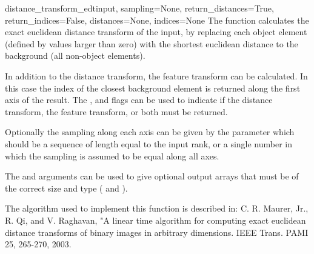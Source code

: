 \begin{funcdesc}{distance_transform_edt}{input, sampling=None,
  return_distances=True, return_indices=False, distances=None, 
  indices=None} The function  calculates 
  the exact euclidean distance transform of the input, by replacing each 
  object element (defined by values larger than zero) with the shortest 
  euclidean distance to the background (all non-object elements).
  
  In addition to the distance transform, the feature transform can be
  calculated. In this case the index of the closest background element is
  returned along the first axis of the result.  The , 
  and  flags can be used to indicate if the distance 
  transform, the feature transform, or both must be returned.
  
  Optionally the sampling along each axis can be given by the 
   parameter which should be a sequence of length equal to 
  the input rank, or a single number in which the sampling is assumed to be 
  equal along all axes.

  The  and  arguments can be used to give 
  optional output arrays that must be of the correct size and type 
  ( and ).
  
  The algorithm used to implement this function is described in: C. R. 
  Maurer, Jr., R. Qi, and V. Raghavan, "A linear time algorithm for 
  computing exact euclidean distance transforms of binary images in 
  arbitrary dimensions. IEEE Trans. PAMI 25, 265-270, 2003.
\end{funcdesc}

